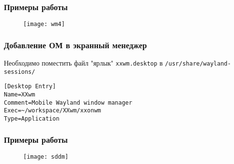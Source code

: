 \begin{frame}
\frametitle{Примеры работы}

\begin{figure}[h!]
\texttt{[image: wm4]}
\end{figure}

\end{frame}


\begin{frame}[fragile]
\frametitle{Добавление ОМ в экранный менеджер}

Необходимо поместить файл "ярлык" \texttt{xxwm.desktop} в \texttt{/usr/share/wayland-sessions/}
\begin{lstlisting}[style=crs_cpp]
[Desktop Entry]
Name=XXwm
Comment=Mobile Wayland window manager
Exec=~/workspace/XXwm/xxonwm
Type=Application
\end{lstlisting}

\end{frame}


\begin{frame}
\frametitle{Примеры работы}

\begin{figure}[h!]
\texttt{[image: sddm]}
\end{figure}

\end{frame}






